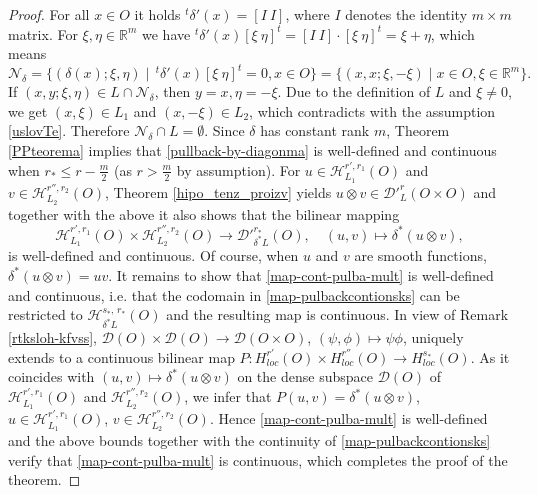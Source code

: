 \documentclass{amsart}
\theoremstyle{definition}
\begin{document}
\begin{proof}
For all $x\in O$ it holds $ ^t \delta ' (x) = [I \ I]$, where $I$ denotes the identity $m\times m$ matrix. For $\xi, \eta \in \mathbb{R}^m$ we have $ ^t \delta ' (x) [\xi \ \eta]^t = [I \ I] \cdot [\xi \ \eta]^t = \xi+\eta$, which means
\begin{equation*}
\mathcal{N}_{\delta}= \{ (\delta (x) ; \xi , \eta) \mid \, ^t \delta ' (x) [\xi \ \eta]^t = 0 , x\in O \}= \{ (x,x ; \xi , -\xi) \mid x\in O , \xi \in \mathbb{R}^m \}.
\end{equation*}
If $(x,y;\xi,\eta)\in L \cap \mathcal{N}_{\delta}$, then $y=x,\eta=-\xi$. Due to the definition of $L$ and $\xi\neq 0$, we get $(x,\xi)\in L_1$ and $(x,-\xi)\in L_2$, which contradicts with the assumption \eqref{uslovTe}. Therefore $\mathcal{N}_{\delta} \cap L = \emptyset$. Since $\delta$ has constant rank $m$, Theorem \ref{PPteorema} implies that \eqref{pullback-by-diagonma} is well-defined and continuous when $r_*\leq r-\frac{m}{2}$ (as $r>\frac{m}{2}$ by assumption). For $u\in\mathscr{H}_{L_1} ^{r',r_1} (O)$ and $v\in\mathscr{H}_{L_2} ^{r'',r_2} (O)$, Theorem \ref{hipo_tenz_proizv} yields $u\otimes v\in \mathcal{D}'^r_L (O\times O)$ and together with the above it also shows that the bilinear mapping
\begin{equation}\label{map-pulbackcontionsks}
\mathscr{H}_{L_1} ^{r',r_1} (O)\times\mathscr{H}_{L_2} ^{r'',r_2} (O)\rightarrow \mathcal{D}'^{r_*}_{\delta^* L}(O),\quad (u,v)\mapsto \delta^*(u \otimes v),
\end{equation}
is well-defined and continuous. Of course, when $u$ and $v$ are smooth functions, $\delta^*(u\otimes v)=uv$. It remains to show that \eqref{map-cont-pulba-mult} is well-defined and continuous, i.e. that the codomain in \eqref{map-pulbackcontionsks} can be restricted to $\mathscr{H}_{\delta^* L} ^{s_*, \, r_*} (O)$ and the resulting map is continuous. In view of Remark \ref{rtksloh-kfvss}, $\mathcal{D}(O)\times \mathcal{D}(O)\rightarrow \mathcal{D}(O\times O)$, $(\psi,\phi)\mapsto \psi\phi$, uniquely extends to a continuous bilinear map $P:H_{loc} ^{r'} (O)\times H_{loc} ^{r''} (O)\rightarrow H_{loc} ^{s_*} (O)$. As it coincides with $(u,v)\mapsto \delta^*(u\otimes v)$ on the dense subspace $\mathcal{D}(O)$ of $\mathscr{H}_{L_1} ^{r',r_1} (O)$ and $\mathscr{H}_{L_2} ^{r'',r_2} (O)$, we infer that $P(u,v)=\delta^*(u\otimes v)$, $u\in \mathscr{H}_{L_1} ^{r',r_1} (O)$, $v\in \mathscr{H}_{L_2} ^{r'',r_2} (O)$. Hence \eqref{map-cont-pulba-mult} is well-defined and the above bounds together with the continuity of \eqref{map-pulbackcontionsks} verify that \eqref{map-cont-pulba-mult} is continuous, which completes the proof of the theorem.
\end{proof}
\end{document}
